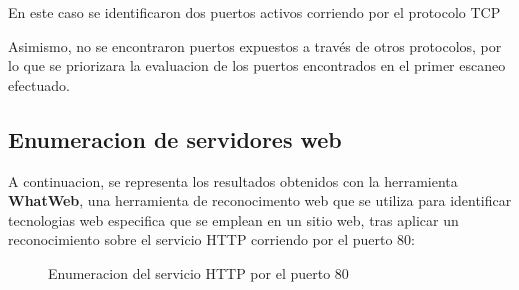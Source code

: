 \documentclass[a4paper]{article} %
\begin{document}
  \vspace{0.3cm}

  En este caso se identificaron dos puertos activos corriendo por el protocolo TCP  

  \vspace{0.5cm}

  \centering

  \vspace{0.5cm}

  \justifying %

Asimismo, no se encontraron puertos expuestos a través de otros protocolos, por lo que se priorizara la evaluacion de los puertos encontrados en el primer escaneo efectuado.

  \clearpage

  \subsection{Enumeracion de servidores web}


  A continuacion, se representa los resultados obtenidos con la herramienta \textbf{WhatWeb}, una herramienta de reconocimento web que se utiliza para identificar tecnologias web especifica que se emplean en un sitio web, tras aplicar un reconocimiento sobre el servicio HTTP corriendo por el puerto 80:

  \vspace{0.3cm}

  \begin{figure}[h]

    \centering
    \setlength{\fboxrule}{1.8pt}
      \caption{Enumeracion del servicio HTTP por el puerto 80}
  \end{figure}

  \vspace{0.3cm}
\end{document}
